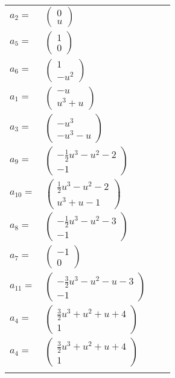 \documentclass[1p]{elsarticle_modified}
\theoremstyle{definition}
\begin{document}
\begin{tabular}{m{7pt} m{180pt} m{7pt} m{180pt} }
\flushright $a_{2}=$&$\begin{pmatrix}0\\u\end{pmatrix}$ \\
\flushright $a_{5}=$&$\begin{pmatrix}1\\0\end{pmatrix}$ \\
\flushright $a_{6}=$&$\begin{pmatrix}1\\- u^2\end{pmatrix}$ \\
\flushright $a_{1}=$&$\begin{pmatrix}- u\\u^3+u\end{pmatrix}$ \\
\flushright $a_{3}=$&$\begin{pmatrix}- u^3\\- u^3- u\end{pmatrix}$ \\
\flushright $a_{9}=$&$\begin{pmatrix}-\frac{1}{2} u^3- u^2-2\\-1\end{pmatrix}$ \\
\flushright $a_{10}=$&$\begin{pmatrix}\frac{1}{2} u^3- u^2-2\\u^3+u-1\end{pmatrix}$ \\
\flushright $a_{8}=$&$\begin{pmatrix}-\frac{1}{2} u^3- u^2-3\\-1\end{pmatrix}$ \\
\flushright $a_{7}=$&$\begin{pmatrix}-1\\0\end{pmatrix}$ \\
\flushright $a_{11}=$&$\begin{pmatrix}-\frac{3}{2} u^3- u^2- u-3\\-1\end{pmatrix}$ \\
\flushright $a_{4}=$&$\begin{pmatrix}\frac{3}{2} u^3+u^2+u+4\\1\end{pmatrix}$\\ \flushright $a_{4}=$&$\begin{pmatrix}\frac{3}{2} u^3+u^2+u+4\\1\end{pmatrix}$\\&\end{tabular}
\end{document}
